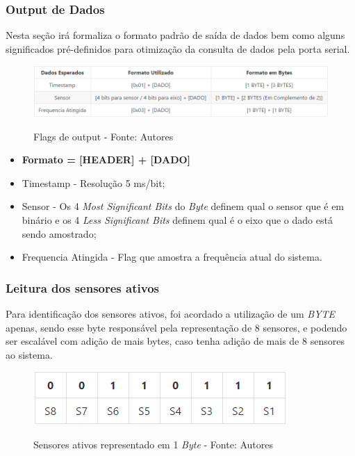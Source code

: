 \subsubsection*{Output de Dados}

Nesta seção irá formaliza o formato padrão de saída de dados bem como alguns significados pré-definidos para otimização da consulta de dados pela porta serial.

\begin{figure}[H]
\centering
\includegraphics[keepaspectratio=true,scale=0.8]{figuras/flags_output.png}
\label{fig:flags_input}
\caption{Flags de output - Fonte: Autores}
\end{figure}

\begin{itemize}
  \item \textbf{Formato = [HEADER] + [DADO]}
  \item Timestamp - Resolução 5 ms/bit;
  \item Sensor - Os 4 \textit{Most Significant Bits} do \textit{Byte} definem qual o sensor que é em binário e os 4 \textit{Less Significant Bits} definem qual é o eixo que o dado está sendo amostrado;
  \item Frequencia Atingida - Flag que amostra a frequência atual do sistema.
\end{itemize}

\subsubsection*{Leitura dos sensores ativos}

Para identificação dos sensores ativos, foi acordado a utilização de um \textit{BYTE} apenas, sendo esse byte responsável pela representação de 8 sensores, e podendo ser escalável com adição de mais bytes, caso tenha adição de mais de 8 sensores ao sistema.

\begin{figure}[H]
\centering
\includegraphics[keepaspectratio=true,scale=0.9]{figuras/active_sensors.png}
\label{fig:active_sensors}
\caption{Sensores ativos representado em 1 \textit{Byte} - Fonte: Autores}
\end{figure}

